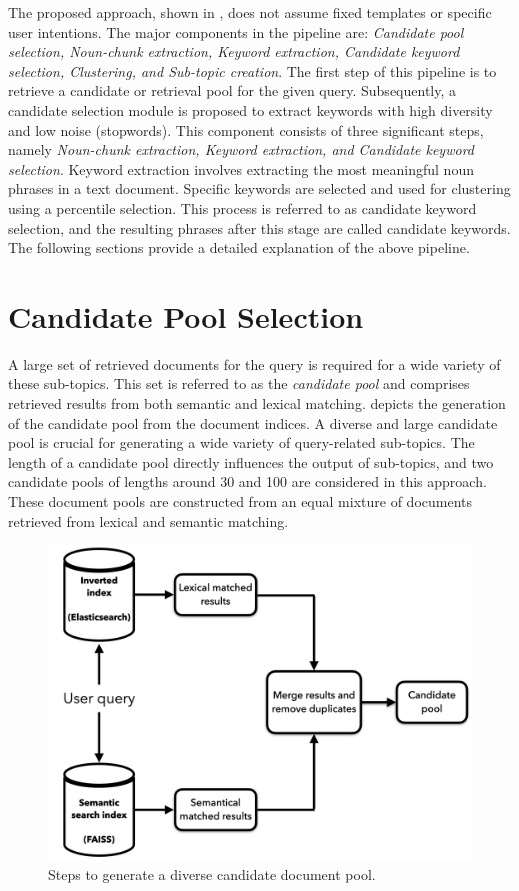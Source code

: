 The proposed approach, shown in , does not assume fixed templates or specific user intentions. The major components in the pipeline are: \textit{Candidate pool selection, Noun-chunk extraction, Keyword extraction, Candidate keyword selection, Clustering, and Sub-topic creation}. The first step of this pipeline is to retrieve a candidate or retrieval pool for the given query. Subsequently, a candidate selection module is proposed to extract keywords with high diversity and low noise (stopwords). This component consists of three significant steps, namely \textit{Noun-chunk extraction, Keyword extraction, and Candidate keyword selection}. Keyword extraction involves extracting the most meaningful noun phrases in a text document. Specific keywords are selected and used for clustering using a percentile selection. This process is referred to as candidate keyword selection, and the resulting phrases after this stage are called candidate keywords. The following sections provide a detailed explanation of the above pipeline.




\section{Candidate Pool Selection}


A large set of retrieved documents for the query is required for a wide variety of these sub-topics. This set is referred to as the \textit{candidate pool} and comprises retrieved results from both semantic and lexical matching.  depicts the generation of the candidate pool from the document indices. A diverse and large candidate pool is crucial for generating a wide variety of query-related sub-topics. The length of a candidate pool directly influences the output of sub-topics, and two candidate pools of lengths around 30 and 100 are considered in this approach. These document pools are constructed from an equal mixture of documents retrieved from lexical and semantic matching.


\begin{figure}[h]
	\centering
	\includegraphics[width=.8\textwidth]{images/thesis_images/candidate_pool.png}
	\caption{Steps to generate a diverse candidate document pool.  \label{fig:candidate_pool}}
\end{figure}


